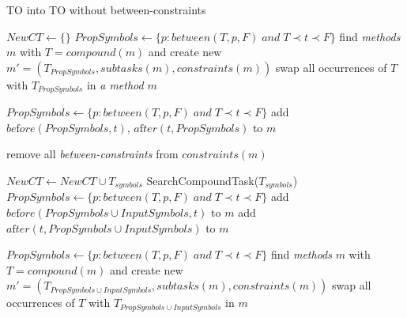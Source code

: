 \begin{algorithm}
    \caption{TO into TO without between-constraints}\label{alg04:1}
    \begin{algorithmic}[1]
            \State $NewCT \gets \{\}$ 
                    \State $PropSymbols \gets \{p: between(T, p, F) \; and \; T \prec t \prec F \}$
                        \State find \emph{methods} $m$ with $T = compound(m)$ and create new $m'=(T_{PropSymbols}, subtasks(m), constraints(m))$
                    \EndIf
                    \State swap all occurrences of $T$ with $T_{PropSymbols}$ in \emph{a method} $m$
                \EndFor

                    \State $PropSymbols \gets \{p: between(T, p, F) \; and \; T \prec t \prec F \}$
                    \State {}
                    \State add $be\text{f}ore(PropSymbols, t)$, $a\text{f}ter(t, PropSymbols)$ to $m$
                \EndFor
                
                \State remove all \emph{between-constraints} from $constraints(m)$

                    \State $NewCT \gets NewCT \cup T_{symbols}$
                    \State SearchCompoundTask($T_{symbols}$)
                \EndFor
            \EndWhile
        \EndProcedure
                    \State $PropSymbols \gets \{p: between(T, p, F) \; and \; T \prec t \prec F \}$
                    \State add $be\text{f}ore(PropSymbols \cup InputSymbols, t)$ to $m$
                    \State add $a\text{f}ter(t, PropSymbols \cup InputSymbols)$ to $m$
                \EndFor

                    \State $PropSymbols \gets \{p: between(T, p, F) \; and \; T \prec t \prec F \}$
                        \State find \emph{methods} $m$ with $T = compound(m)$ and create new $m'=(T_{PropSymbols \cup InputSymbols}, subtasks(m), constraints(m))$
                    \EndIf
                    \State swap all occurrences of $T$ with $T_{PropSymbols \cup InputSymbols}$ in $m$
                \EndFor


\end{algorithmic}
\end{algorithm}
